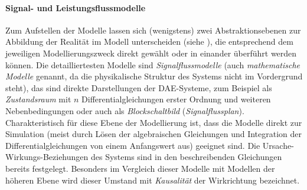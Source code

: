 \paragraph{Signal- und Leistungsflussmodelle} Zum Aufstellen der Modelle lassen sich (wenigstens) zwei Abstraktionsebenen zur Abbildung der Realität im Modell unterscheiden (siehe \cite{janschekSystementwurfMechatronischerSysteme2010}), die entsprechend dem jeweiligen Modellierungszweck direkt gewählt oder in einander überführt werden können. Die detailliertesten Modelle sind \emph{Signalflussmodelle} (auch \emph{mathematische Modelle} genannt, da die physikalische Struktur des Systems nicht im Vordergrund steht), das sind direkte Darstellungen der DAE-Systeme, zum Beispiel als \emph{Zustandsraum} mit $n$ Differentialgleichungen erster Ordnung und weiteren Nebenbedingungen oder auch als \emph{Blockschaltbild} (\emph{Signalflussplan}). Charakteristisch für diese Ebene der Modellierung ist, dass die Modelle direkt zur Simulation (meist durch Lösen der algebraischen Gleichungen und Integration der Differentialgleichungen von einem Anfangswert aus) geeignet sind. Die Ursache-Wirkungs-Beziehungen des Systems sind in den beschreibenden Gleichungen bereits festgelegt. Besonders im Vergleich dieser Modelle mit Modellen der höheren Ebene wird dieser Umstand mit \emph{Kausalität} der Wirkrichtung bezeichnet.

